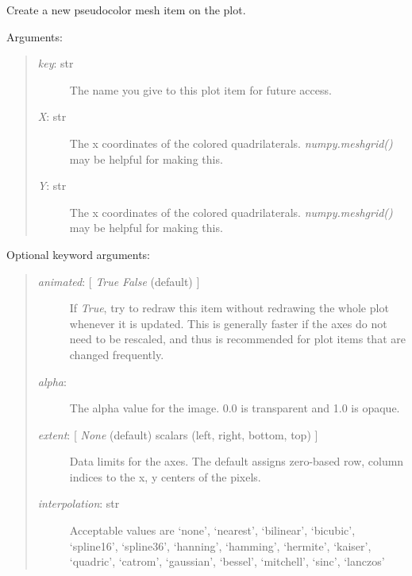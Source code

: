 \documentclass[letterpaper,10pt,english]{sphinxmanual}
\begin{document}
\begin{fulllineitems}
\begin{fulllineitems}
\label{api:controls.Plot2D.new_colormesh}
Create a new pseudocolor mesh item on the plot.

Arguments:
\begin{quote}
\begin{description}
\item[{\emph{key}: str}] \leavevmode
The name you give to this plot item for future access.

\item[{\emph{X}: str}] \leavevmode
The x coordinates of the colored quadrilaterals.
\emph{numpy.meshgrid()} may be helpful for making this.

\item[{\emph{Y}: str}] \leavevmode
The x coordinates of the colored quadrilaterals.
\emph{numpy.meshgrid()} may be helpful for making this.

\end{description}
\end{quote}

Optional keyword arguments:
\begin{quote}
\begin{description}
\item[{\emph{animated}: {[} \emph{True} \textbar{} \emph{False} (default) {]}}] \leavevmode
If \emph{True}, try to redraw this item without redrawing the whole plot
whenever it is updated. This is generally faster if the axes do not
need to be rescaled, and thus is recommended for plot items that 
are changed frequently.

\item[{\emph{alpha}: }] \leavevmode
The alpha value for the image. 0.0 is transparent and 1.0 is opaque.

\item[{\emph{extent}:  {[} \emph{None} (default) \textbar{} scalars (left, right, bottom, top) {]}}] \leavevmode
Data limits for the axes. The default assigns zero-based row, 
column indices to the x, y centers of the pixels.

\item[{\emph{interpolation}: str}] \leavevmode
Acceptable values are `none', `nearest', `bilinear',
`bicubic', `spline16', `spline36', `hanning', `hamming',
`hermite', `kaiser', `quadric', `catrom', `gaussian',
`bessel', `mitchell', `sinc', `lanczos'


\end{description}
\end{quote}
\end{fulllineitems}
\end{fulllineitems}
\end{document}
